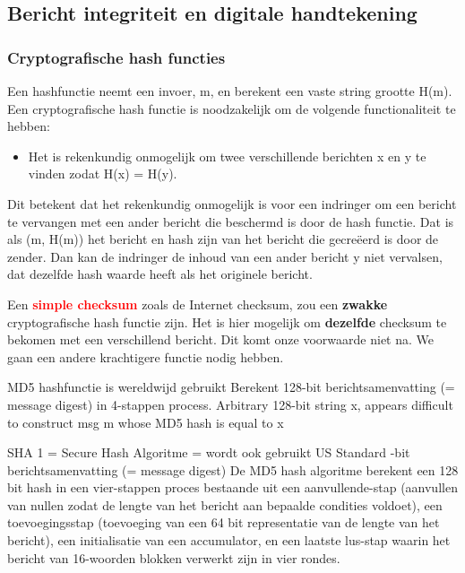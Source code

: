 \subsection{Bericht integriteit en digitale handtekening}
\subsubsection{Cryptografische hash functies}

Een hashfunctie neemt een invoer, m, en berekent een vaste string grootte H(m). Een cryptografische hash functie is noodzakelijk om de volgende functionaliteit te hebben:
\begin{itemize}
\item Het is rekenkundig onmogelijk om twee verschillende berichten x en y te vinden zodat H(x) = H(y).
\end{itemize}

\noindent Dit betekent dat het rekenkundig onmogelijk is voor een indringer om een bericht te vervangen met een ander bericht die beschermd is door de hash functie. Dat is als (m, H(m)) het bericht en hash zijn van het bericht die gecreëerd is door de zender. Dan kan de indringer de inhoud van een ander bericht y niet vervalsen, dat dezelfde hash waarde heeft als het originele bericht.

\noindent Een \textcolor{red}{\textbf{simple checksum}} zoals de Internet checksum, zou een \textbf{zwakke} cryptografische hash functie zijn. Het is hier mogelijk om \textbf{dezelfde} checksum te bekomen met een verschillend bericht. Dit komt onze voorwaarde niet na. We gaan een andere krachtigere functie nodig hebben.

\newpage


\bi
\itf MD5 hashfunctie is wereldwijd gebruikt
    \bi
    \itf Berekent 128-bit berichtsamenvatting (= message digest) in 4-stappen process.
    \itf Arbitrary 128-bit string x, appears difficult to construct msg m whose MD5 hash is equal to x
    \ei

\itf SHA 1 = Secure Hash Algoritme = wordt ook gebruikt
    \bi
    \itf US Standard
    -bit berichtsamenvatting (= message digest)
    \ei
\ei
De MD5 hash algoritme berekent een 128 bit hash in een vier-stappen proces bestaande uit een aanvullende-stap (aanvullen van nullen zodat de lengte van het bericht aan bepaalde condities voldoet), een toevoegingsstap (toevoeging van een 64 bit representatie van de lengte van het bericht), een initialisatie van een accumulator, en een laatste lus-stap waarin het bericht van 16-woorden blokken verwerkt zijn in vier rondes.

